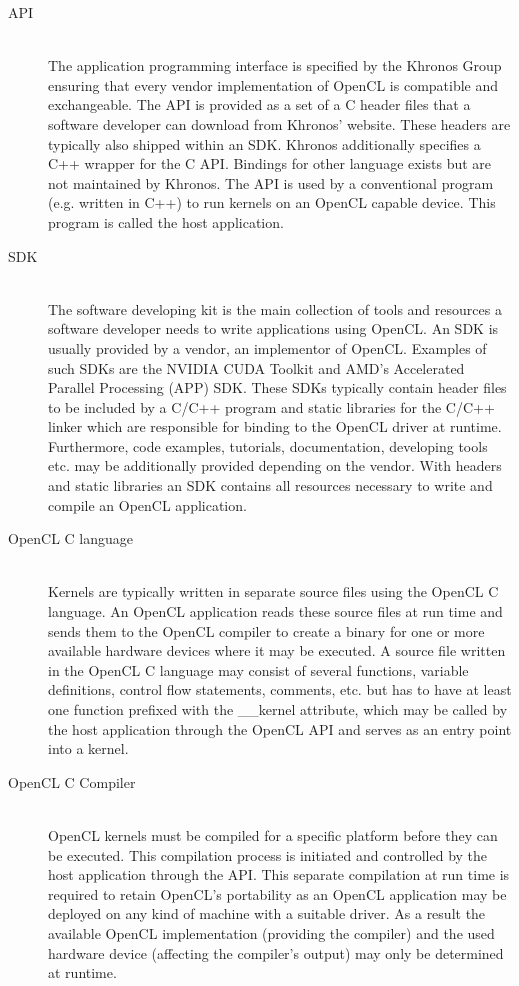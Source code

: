 \begin{description}
	\item[API] \hfill \\
	The application programming interface is specified by the Khronos Group ensuring that every vendor implementation of OpenCL is compatible and exchangeable. The API is provided as a set of a C header files that a software developer can download from Khronos' website. These headers are typically also shipped within an SDK. Khronos additionally specifies a C++ wrapper for the C API. Bindings for other language exists but are not maintained by Khronos.
	The API is used by a conventional program (e.g. written in C++) to run kernels on an OpenCL capable device. This program is called the host application.
	\item[SDK] \hfill \\
	The software developing kit is the main collection of tools and resources a software developer needs to write applications using OpenCL. An SDK is usually provided by a vendor, an implementor of OpenCL. Examples of such SDKs are the NVIDIA CUDA Toolkit and AMD's Accelerated Parallel Processing (APP) SDK. These SDKs typically contain header files to be included by a C/C++ program and static libraries for the C/C++ linker which are responsible for binding to the OpenCL driver at runtime. Furthermore, code examples, tutorials, documentation, developing tools etc. may be additionally provided depending on the vendor. With headers and static libraries an SDK contains all resources necessary to write and compile an OpenCL application.
	\item[OpenCL C language] \hfill \\
	Kernels are typically written in separate source files using the OpenCL C language. An OpenCL application reads these source files at run time and sends them to the OpenCL compiler to create a binary for one or more available hardware devices where it may be executed. A source file written in the OpenCL C language may consist of several functions, variable definitions, control flow statements, comments, etc. but has to have at least one function prefixed with the \_\_kernel attribute, which may be called by the host application through the OpenCL API and serves as an entry point into a kernel.
	\item[OpenCL C Compiler] \hfill \\
	OpenCL kernels must be compiled for a specific platform before they can be executed. This compilation process is initiated and controlled by the host application through the API. This separate compilation at run time is required to retain OpenCL's portability as an OpenCL application may be deployed on any kind of machine with a suitable driver. As a result the available OpenCL implementation (providing the compiler) and the used hardware device (affecting the compiler's output) may only be determined at runtime.

\end{description}
